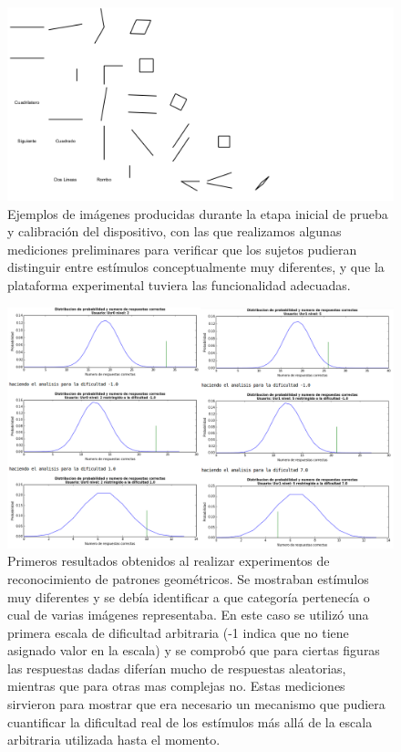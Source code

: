 \documentclass{article}
\numberwithin{figure}{section}
\begin{document}
    \begin{figure}
        \center
        \includegraphics[width=\textwidth]{Imagenes/ImagenesDesarrollo1.png}
        \caption{Ejemplos de imágenes producidas durante la etapa inicial de prueba y calibración del dispositivo, con las que realizamos algunas mediciones preliminares para verificar que los sujetos pudieran distinguir entre estímulos conceptualmente muy diferentes, y que la plataforma experimental tuviera las funcionalidad adecuadas.}
        \label{fig:ImagenesDesarrollo1}
    \end{figure}  
    
    
    \begin{figure}
        \center
        \includegraphics[width=\textwidth]{Imagenes/ResultadosIniciales1.png}
        \caption{Primeros resultados obtenidos al realizar experimentos de reconocimiento de patrones geométricos. Se mostraban estímulos muy diferentes y se debía identificar a que categoría pertenecía o cual de varias imágenes representaba. En este caso se utilizó una primera escala de dificultad arbitraria (-1 indica que no tiene asignado valor en la escala) y se comprobó que para ciertas figuras las respuestas dadas diferían mucho de respuestas aleatorias, mientras que para otras mas complejas no. Estas mediciones sirvieron para mostrar que era necesario un mecanismo que pudiera cuantificar la dificultad real de los estímulos más allá de la escala arbitraria utilizada hasta el momento.}
        \label{fig:ResultadosPreliminar}
    \end{figure}  
    
\end{document}
